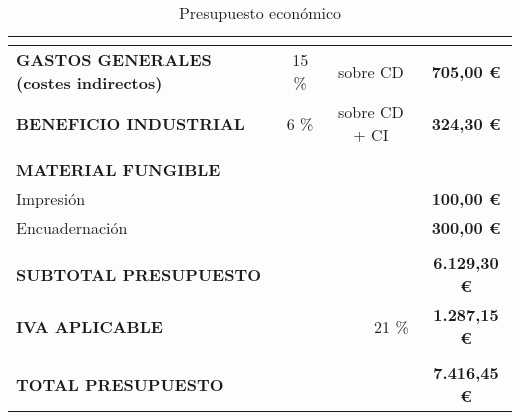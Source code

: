 \begin{table}[H]
{\begin{tabular}{lllllc}
& & & & & 
\multicolumn{1}{l}{} \\  
\hline

\multicolumn{1}{|l|}{\textbf{GASTOS GENERALES (costes indirectos)}} & 
\multicolumn{1}{c|}{15 \%} & 
\multicolumn{3}{c|}{sobre CD} & 
\multicolumn{1}{c|}{\textbf{705,00 \euro}} \\ 
\hline

\multicolumn{1}{|l|}{\textbf{BENEFICIO INDUSTRIAL}} & 
\multicolumn{1}{c|}{6 \%} & 
\multicolumn{3}{c|}{sobre CD + CI} &
\multicolumn{1}{c|}{\textbf{324,30 \euro}} \\ 
\hline

& & & & & 
\multicolumn{1}{l}{} \\

\multicolumn{6}{l}{\textbf{MATERIAL FUNGIBLE}} \\
\hline 

\multicolumn{5}{|l|}{Impresión} & 
\multicolumn{1}{c|}{\textbf{100,00 \euro}} \\ 
\hline 

\multicolumn{5}{|l|}{Encuadernación} & 
\multicolumn{1}{c|}{\textbf{300,00 \euro}} \\ 
\hline

& & & & & 
\multicolumn{1}{l}{} \\
\hline

\multicolumn{5}{|l|}{\textbf{SUBTOTAL PRESUPUESTO}} & 
\multicolumn{1}{c|}{\textbf{6.129,30 \euro}} \\ 
\hline

\multicolumn{4}{|l|}{\textbf{IVA APLICABLE}} & 
\multicolumn{1}{c|}{21 \%} & 
\multicolumn{1}{c|}{\textbf{1.287,15 \euro}} \\ 
\hline

& & & & &
\multicolumn{1}{l}{} \\ 
\hline

\multicolumn{5}{|l|}{\textbf{TOTAL PRESUPUESTO}} & 
\multicolumn{1}{c|}{\textbf{7.416,45 \euro}} \\ 
\hline

\end{tabular}}
    \caption{Presupuesto económico}
    \label{presupuesto-economico}
    
\end{table}